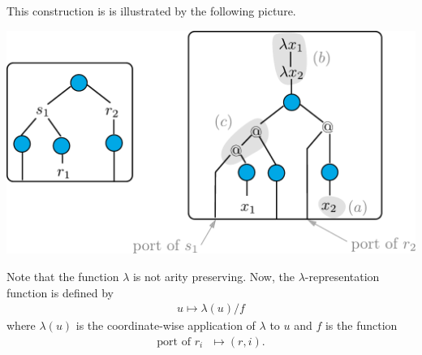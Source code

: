 This construction is is illustrated by the following picture.
\begin{center}
\includegraphics[scale=.33]{pictures/lambda}
\end{center}
Note that the function $\lambda$ is not arity preserving. Now, the $\lambda$-representation function is defined by
\begin{align*}
u \mapsto \lambda(u)/f 
\end{align*}
 where $\lambda(u)$ is the coordinate-wise application of $\lambda$ to $u$ and $f$ is the function
 \begin{align*}
 \text{port of $r_i$ } \mapsto (r,i).
 \end{align*}


